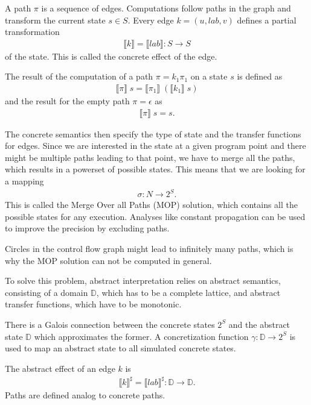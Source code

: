 A path $\pi$ is a sequence of edges.
Computations follow paths in the graph and transform the current state $s \in S$.
Every edge $k = (u, lab, v)$ defines a partial transformation
\begin{align}
\llbracket k \rrbracket = \llbracket lab \rrbracket : S \to S
\end{align}
of the state. This is called the concrete effect of the edge.

The result of the computation of a path $\pi = k_1 \pi_1$ on a state $s$ is defined as
\begin{align}
\llbracket \pi \rrbracket \; s = \llbracket \pi_1 \rrbracket \; (\llbracket k_1 \rrbracket \; s)
\end{align}
and the result for the empty path $\pi = \epsilon$ as
\begin{align}
\llbracket \pi \rrbracket \; s = s.
\end{align}

The concrete semantics then specify the type of state and the transfer functions for edges.
Since we are interested in the state at a given program point and there might be multiple paths leading to that point, we have to merge all the paths, which results in a powerset of possible states. This means that we are looking for a mapping
\begin{align}
\sigma : N \to 2^S.
\end{align}
This is called the Merge Over all Paths (MOP) solution, which contains all the possible states for any execution.
Analyses like constant propagation can be used to improve the precision by excluding paths.

Circles in the control flow graph might lead to infinitely many paths, which is why the MOP solution can not be computed in general.

To solve this problem, abstract interpretation relies on abstract semantics, consisting of a domain $\mathbb{D}$, which has to be a complete lattice, and abstract transfer functions, which have to be monotonic.

There is a Galois connection between the concrete states $2^S$ and the abstract state $\mathbb{D}$ which approximates the former.
A concretization function $\gamma : \mathbb{D} \to 2^S$ is used to map an abstract state to all simulated concrete states.

The abstract effect of an edge $k$ is
\begin{align}
\llbracket k \rrbracket^\sharp = \llbracket lab \rrbracket^\sharp : \mathbb{D} \to \mathbb{D}.
\end{align}
Paths are defined analog to concrete paths.

